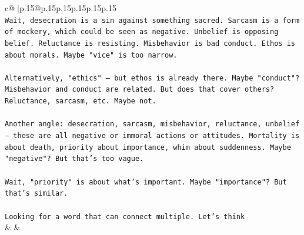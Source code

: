\documentclass{article}
\begin{document}
{\begin{supertabular}{c@{$\;$}|p{.15\linewidth}@{}p{.15\linewidth}p{.15\linewidth}p{.15\linewidth}p{.15\linewidth}p{.15\linewidth}}
{{{\\ 
\texttt{Wait, desecration is a sin against something sacred. Sarcasm is a form of mockery, which could be seen as negative. Unbelief is opposing belief. Reluctance is resisting. Misbehavior is bad conduct. Ethos is about morals. Maybe "vice" is too narrow. } \\
\\ 
\texttt{Alternatively, "ethics" – but ethos is already there. Maybe "conduct"? Misbehavior and conduct are related. But does that cover others? Reluctance, sarcasm, etc. Maybe not. } \\
\\ 
\texttt{Another angle: desecration, sarcasm, misbehavior, reluctance, unbelief – these are all negative or immoral actions or attitudes. Mortality is about death, priority about importance, whim about suddenness. Maybe "negative"? But that's too vague. } \\
\\ 
\texttt{Wait, "priority" is about what's important. Maybe "importance"? But that's similar. } \\
\\ 
\texttt{Looking for a word that can connect multiple. Let's think} \\
            }
        }
    }
    & & \\ \\


\end{supertabular}}
\end{document}
